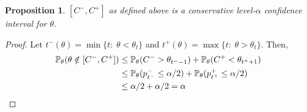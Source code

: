 \documentclass{article}
\newtheorem{proposition}[theorem]{Proposition}
\theoremstyle{definition}
\begin{document}
\begin{proposition}
  $[C^-, C^+]$ as defined above is a conservative level-$\alpha$ confidence interval for $\theta$.
\end{proposition}
\begin{proof}
  Let $t^-(\theta) = \min\{t:\; \theta < \theta_t\}$ and $t^+(\theta)=\max \{t:\; \theta > \theta_t\}$. Then,
\begin{align}
  \P_\theta( \theta \notin [C^-, C^+]) 
  &\leq \P_\theta( C^- > \theta_{t^- - 1}) + \P_\theta( C^+ < \theta_{t^+ + 1})\\
  &\leq \P_\theta( p_{t^-}^- \leq \alpha/2) + \P_\theta( p_{t^+}^+ \leq \alpha/2)\\
  &\leq \alpha/2 + \alpha/2 = \alpha
\end{align}
\end{proof}







\end{document}
